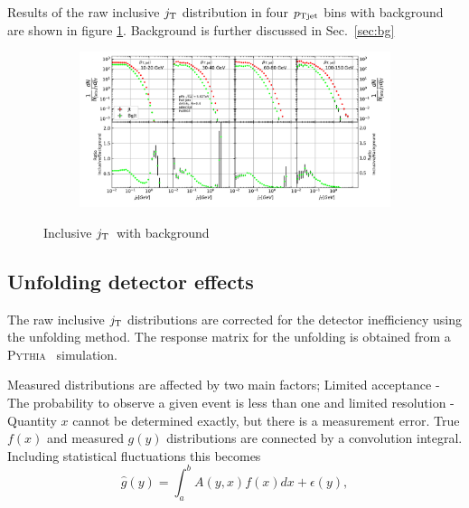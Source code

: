 Results of the raw inclusive $j_{\rm T}$ distribution in four $p_{\rm Tjet}$ bins with background are shown in figure \ref{fig:inclusive}. Background is further discussed in Sec.~\ref{sec:bg}
 
 \begin{figure}
\centering
\begin{subfigure}{0.95\textwidth}
\includegraphics[width=\textwidth]{results/MixedFullJetsR04JetConeJtInclusive.pdf}
\end{subfigure}
\caption{Inclusive $j_{\rm T}$ with background}
\label{fig:inclusive}
\end{figure}
 
 
 
\subsection{Unfolding detector effects}
The raw inclusive $j_{\rm T}$ distributions are corrected for the detector inefficiency using the unfolding method. The response matrix for the unfolding is obtained from a \textsc{Pythia}~\cite{introPythia81} simulation.

Measured distributions are affected by two main factors; Limited acceptance - The probability to observe a given event is less than one and limited resolution - Quantity $x$ cannot be determined exactly, but there is a measurement error. True $f(x)$ and measured $g(y)$ distributions are connected by a convolution integral. Including statistical fluctuations this becomes
\begin{equation}
\hat g(y) = \int_a^b A\left(y,x\right) f(x) dx + \epsilon(y),
\end{equation}

